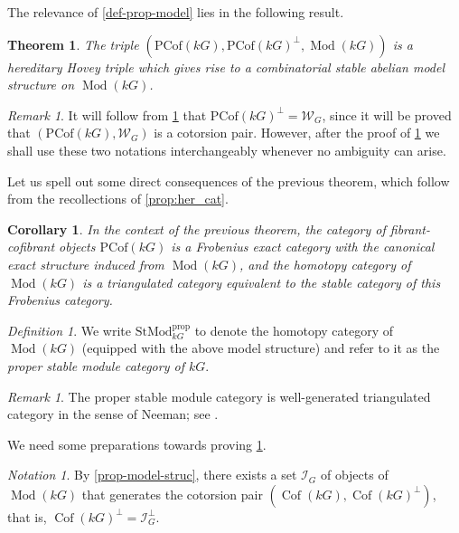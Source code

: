 \documentclass{amsart}
\def \Wfin{{\mathcal W}_{G}}
\DeclareMathOperator{\Mod}{Mod}
\DeclareMathOperator{\Cof}{Cof}
\numberwithin{equation}{section}%
\newtheorem{theorem}[equation]{Theorem}
\newtheorem{corollary}[equation]{Corollary}
\theoremstyle{remark}
\newtheorem{definition}[equation]{Definition}
\newtheorem{remark}[equation]{Remark}
\newtheorem{notation}[equation]{Notation}
\begin{document}
The relevance of  \cref{def-prop-model} lies in the following result. 


\begin{theorem}\label{thm-proper-coto}
    The triple $(\mathrm{PCof}(kG),\mathrm{PCof}(kG)^\perp,\Mod(kG))$ is a hereditary Hovey triple which gives rise to a combinatorial stable abelian model structure on $\Mod(kG)$. 
\end{theorem}   

\begin{remark}
It will follow from \cref{thm-proper-coto} that $\mathrm{PCof}(kG)^\perp = \Wfin$, since it will be proved that $(\mathrm{PCof}(kG), \Wfin)$ is a cotorsion pair. However, after the proof of \cref{thm-proper-coto} we shall use these two notations interchangeably whenever no ambiguity can arise.
\end{remark}

 Let us spell out some direct consequences of the previous theorem, which follow from the recollections of \cref{prop:her_cat}.

\begin{corollary}
     In the context of the previous theorem, the category of fibrant-cofibrant objects $\mathrm{PCof}(kG)$ is a Frobenius exact category with the canonical exact structure induced from $\Mod(kG)$, and the homotopy category of  $\Mod(kG)$ is a triangulated category equivalent to  the stable category of this Frobenius category. 
\end{corollary}

\begin{definition} 
\label{def:proper}
    We write $\mathrm{StMod}^\mathrm{prop}_{kG}$ to denote the homotopy category of $\Mod(kG)$ (equipped with the above model structure) and refer to it as the \textit{proper stable module category of $kG$}.  
\end{definition}

\begin{remark}
\label{rem:ros}
The proper stable module category is well-generated triangulated category in the sense of Neeman; see \cite[Proposition 6.10]{Ros05}.    
\end{remark}





We need some preparations towards proving \cref{thm-proper-coto}. 

\begin{notation} 
By  \cref{prop-model-struc}, there exists a set $\mathcal{I}_G$ of objects of $\Mod(kG)$ that  generates the cotorsion pair $(\Cof(kG),\Cof(kG)^\perp)$, that is, $\Cof(kG)^\perp = \mathcal{I}_G^\perp$.
\end{notation}
\end{document}
